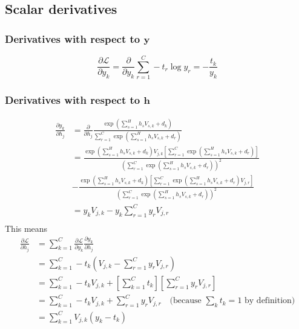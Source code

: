 \documentclass{article}
\begin{document}
\subsection*{Scalar derivatives}

\subsubsection*{Derivatives with respect to $\mathbf{y}$}
\begin{equation}
    \frac{\partial \mathcal{L}}{\partial y_k}
    = \frac{\partial}{\partial y_k} \sum_{r=1}^C - t_r \log y_r
    = -\frac{t_k}{y_k}
\end{equation}

\subsubsection*{Derivatives with respect to $\mathbf{h}$}
\begin{equation}
\begin{split}
    \frac{\partial y_k}{\partial h_j}
    &= \frac{\partial}{\partial h_j}
       \frac{\exp(\sum_{s=1}^H h_s V_{s,k} + d_k)}
            {\sum_{r=1}^C \exp(\sum_{s=1}^H h_s V_{s,k} + d_r)} \\
    &= \frac{\exp(\sum_{s=1}^H h_s V_{s,k} + d_k) V_{j,k}
             \left[\sum_{r=1}^C \exp(\sum_{s=1}^H h_s V_{s,k} + d_r)\right]}
            {\left(\sum_{r=1}^C \exp(\sum_{s=1}^H h_s V_{s,k} + d_r)\right)^2} \\
    &- \frac{\exp(\sum_{s=1}^H h_s V_{s,k} + d_k)
             \left[\sum_{r=1}^C \exp(\sum_{s=1}^H h_s V_{s,k} + d_r) V_{j,r}\right]}
            {\left(\sum_{r=1}^C \exp(\sum_{s=1}^H h_s V_{s,k} + d_r)\right)^2} \\
    &= y_k V_{j,k} - y_k \sum_{r=1}^C y_r V_{j,r} \\
\end{split}
\end{equation}
This means
\begin{equation}
\begin{split}
    \frac{\partial \mathcal{L}}{\partial h_j}
    &= \sum_{k=1}^C \frac{\partial \mathcal{L}}{\partial y_k}
                    \frac{\partial y_k}{\partial h_j} \\
    &= \sum_{k=1}^C -t_k \left(V_{j,k} - \sum_{r=1}^C y_r V_{j,r} \right) \\
    &= \sum_{k=1}^C -t_k V_{j,k} +
       \left[\sum_{k=1}^C t_k \right]\left[\sum_{r=1}^C y_r V_{j,r} \right] \\
    &= \sum_{k=1}^C -t_k V_{j,k} +
       \sum_{r=1}^C y_r V_{j,r} \quad \textrm{(because $\sum_k t_k
       = 1$ by definition)}\\
    &= \sum_{k=1}^C V_{j,k}(y_k - t_k) \\
\end{split}
\end{equation}
\end{document}
